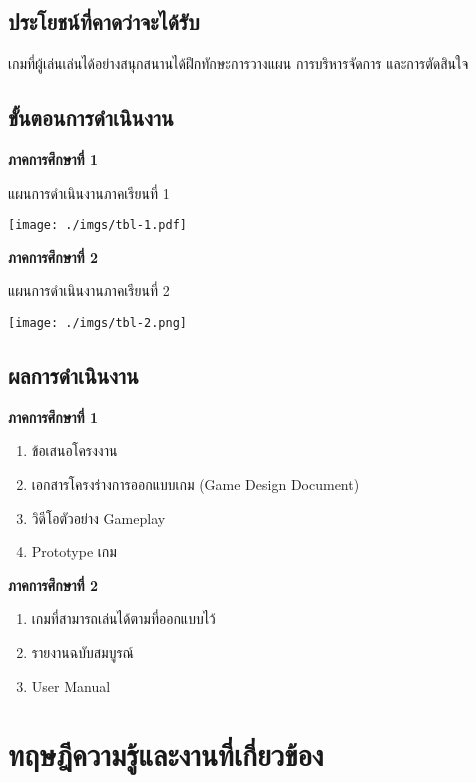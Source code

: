 \documentclass[12pt,oneside,openright,a4paper]{cpe-thai-project}
\begin{document}
\section{ประโยชน์ที่คาดว่าจะได้รับ}

เกมที่ผู้เล่นเล่นได้อย่างสนุกสนานได้ฝึกทักษะการวางแผน การบริหารจัดการ และการตัดสินใจ

\pagebreak
\section{ขั้นตอนการดำเนินงาน}
\textbf{ภาคการศึกษาที่ 1}
\begin{table}[H]
  \caption{แผนการดำเนินงานภาคเรียนที่ 1}\label{tbl:tab-1}
  \texttt{[image: ./imgs/tbl-1.pdf]}
\end{table}

\textbf{ภาคการศึกษาที่ 2}
\begin{table}[H]
  \caption{แผนการดำเนินงานภาคเรียนที่ 2}\label{tbl:tab-2}
  \texttt{[image: ./imgs/tbl-2.png]}
\end{table}

\pagebreak
\section{ผลการดำเนินงาน}
\textbf{ภาคการศึกษาที่ 1}
\begin{enumerate}
  \item ข้อเสนอโครงงาน
  \item เอกสารโครงร่างการออกแบบเกม (Game Design Document) 
  \item วิดีโอตัวอย่าง Gameplay
  \item Prototype เกม
  
\end{enumerate}

\textbf{ภาคการศึกษาที่ 2}
\begin{enumerate}
  \item เกมที่สามารถเล่นได้ตามที่ออกแบบไว้
  \item รายงานฉบับสมบูรณ์
  \item User Manual
\end{enumerate}

\chapter{ทฤษฎีความรู้และงานที่เกี่ยวข้อง}
\end{document}
